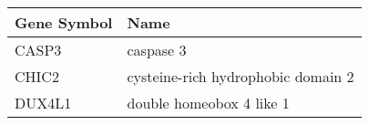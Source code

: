 \begin{tabular}{ll}
\toprule
Gene Symbol &                               Name \\
\midrule
      CASP3 &                          caspase 3 \\
      CHIC2 & cysteine-rich hydrophobic domain 2 \\
     DUX4L1 &           double homeobox 4 like 1 \\
\bottomrule
\end{tabular}
